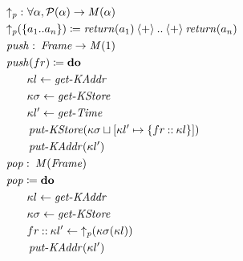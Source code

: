 \begin{figure}

\small\begin{align*}
&\hspace{0em}  \itop{\uparrow_p}   \mathbin{\colon}   \forall   \alpha ,  \mathcal{P} ( \alpha )  \rightarrow   \itop{M}(  \alpha ) \\
&\hspace{0em}  \itop{\uparrow_p} ( \{ a _1  .. a _n  \} )  \coloneqq   \itop{return}( a _1 )  \mathbin{\langle + \rangle}  ..  \mathbin{\langle + \rangle}   \itop{return}( a _n ) \\
&\hspace{0em}  \itop{push}   \mathbin{\colon}   \itop{Frame}   \rightarrow   \itop{M}( 1) \\
&\hspace{0em}  \itop{push}( fr)  \coloneqq   \ttbfop{do}  \\
&\hspace{2em}  \kappa l  \leftarrow   \itop{get-KAddr}  \\
&\hspace{2em}  \kappa  \sigma   \leftarrow   \itop{get-KStore}  \\
&\hspace{2em}  \kappa l'  \leftarrow   \itop{get-Time}  \\
&\hspace{2em}  \itop{put-KStore}(  \kappa  \sigma   \sqcup   \lbrack  \kappa l'  \mapsto   \{ fr \mathbin{::}  \kappa l \}  \rbrack ) \\
&\hspace{2em}  \itop{put-KAddr}(  \kappa l') \\
&\hspace{0em}  \itop{pop}   \mathbin{\colon}   \itop{M}  (\itop{Frame})  \\
&\hspace{0em}  \itop{pop}   \coloneqq   \ttbfop{do}  \\
&\hspace{2em}  \kappa l  \leftarrow   \itop{get-KAddr}  \\
&\hspace{2em}  \kappa  \sigma   \leftarrow   \itop{get-KStore}  \\
&\hspace{2em} fr \mathbin{::}  \kappa l'  \leftarrow   \itop{\uparrow_p} ( \kappa  \sigma ( \kappa l)) \\
&\hspace{2em}  \itop{put-KAddr}(  \kappa l') \\

\end{align*}
\end{figure}
